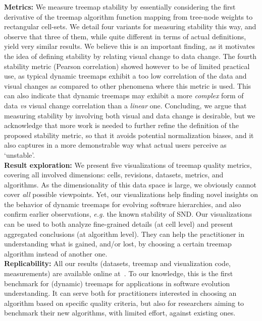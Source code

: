 \noindent\textbf{Metrics:} We measure treemap stability by essentially considering the first derivative of the treemap algorithm function mapping from tree-node weights to rectangular cell-sets. We detail four variants for measuring stability this way, and observe that three of them, while quite different in terms of actual definitions, yield very similar results. We believe this is an important finding, as it motivates the idea of defining stability by relating visual change to data change. The fourth stability metric (Pearson correlation) showed however to be of limited practical use, as typical dynamic treemaps exhibit a too low correlation of the data and visual changes as compared to other phenomena where this metric is used. This can also indicate that dynamic treemaps may exhibit a more \emph{complex} form of data \emph{vs} visual change correlation than a \emph{linear} one. 
Concluding, we argue that measuring stability by involving both visual and data change is desirable, but we acknowledge that more work is needed to further refine the definition of the proposed stability metric, so that it avoids potential normalization biases, and it also captures in a more demonstrable way what actual users perceive as `unstable'.\\

\noindent\textbf{Result exploration:} We present five visualizations of treemap quality metrics, covering all involved dimensions: cells, revisions, datasets, metrics, and algorithms. As the dimensionality of this data space is large, we obviously cannot cover \emph{all} possible viewpoints. Yet, our visualizations help finding novel insights on the behavior of dynamic treemaps for evolving software hierarchies, and also confirm earlier observations, \emph{e.g.} the known stability of SND. Our visualizations can be used to both analyze fine-grained details (at cell level) and present aggregated conclusions (at algorithm level). They can help the practitioner in understanding what is gained, and/or lost, by choosing a certain treemap algorithm instead of another one.\\

\noindent\textbf{Replicability:} All our results (datasets, treemap and visualization code, measurements) are available online at~\citep{benchmark}. To our knowledge, this is the first benchmark for (dynamic) treemaps for applications in software evolution understanding. It can serve both for practitioners interested in choosing an algorithm based on specific quality criteria, but also for researchers aiming to benchmark their new algorithms, with limited effort, against existing ones.\\

